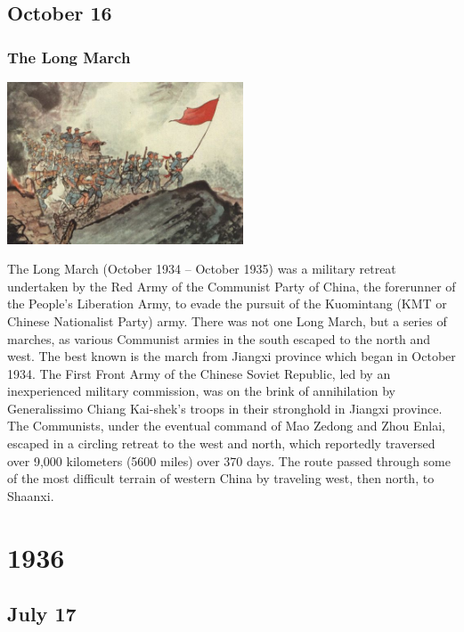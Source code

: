 \documentclass[11pt]{report}
\begin{document}
\section{October 16}
\subsection{The Long March}
\vspace{2mm}\begin{center}\includegraphics[width=7cm]{./img/longMarch.jpg}\end{center}
The Long March (October 1934 – October 1935) was a military retreat undertaken by the Red Army of the Communist Party of China, the forerunner of the People's Liberation Army, to evade the pursuit of the Kuomintang (KMT or Chinese Nationalist Party) army. There was not one Long March, but a series of marches, as various Communist armies in the south escaped to the north and west. The best known is the march from Jiangxi province which began in October 1934. The First Front Army of the Chinese Soviet Republic, led by an inexperienced military commission, was on the brink of annihilation by Generalissimo Chiang Kai-shek's troops in their stronghold in Jiangxi province. The Communists, under the eventual command of Mao Zedong and Zhou Enlai, escaped in a circling retreat to the west and north, which reportedly traversed over 9,000 kilometers (5600 miles) over 370 days. The route passed through some of the most difficult terrain of western China by traveling west, then north, to Shaanxi.

\chapter{1936}
\section{July 17}
\end{document}
